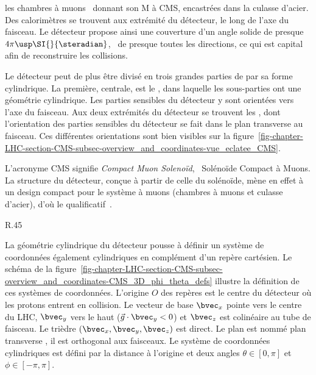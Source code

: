 les chambres à muons~\cite{CERN-LHCC-97-032} donnant son \og M \fg{} à CMS, encastrées dans la culasse d'acier.
Des calorimètres \og \CMSforwards \fg{} se trouvent aux extrémité du détecteur, le long de l'axe du faisceau.
Le détecteur propose ainsi une couverture d'un angle solide de presque $4\pi\usp\SI{}{\steradian}$, \ie\ de presque toutes les directions, ce qui est capital afin de reconstruire les collisions.
\par Le détecteur peut de plus être divisé en trois grandes parties de par sa forme cylindrique.
La première, centrale, est le \og \CMSbarrel \fg, dans laquelle les sous-parties ont une géométrie cylindrique.
Les parties sensibles du détecteur y sont orientées vers l'axe du faisceau.
Aux deux extrémités du détecteur se trouvent les \og \CMSendcaps \fg, dont l'orientation des parties sensibles du détecteur se fait dans le plan transverse au faisceau.
Ces différentes orientations sont bien visibles sur la figure~\ref{fig-chapter-LHC-section-CMS-subsec-overview_and_coordinates-vue_eclatee_CMS}.
\par L'acronyme CMS signifie \emph{Compact Muon Solenoïd}, \ie\ Solénoïde Compact à Muons.
La structure du détecteur, conçue à partir de celle du solénoïde, mène en effet à un design compact pour le système à muons (chambres à muons et culasse d'acier), d'où le qualificatif~\cite{cms_letter_intent}.
\begin{wrapfigure}{R}{.45\textwidth}
\centering

\caption[Système de coordonnées du détecteur CMS.]{Système de coordonnées.}
\label{fig-chapter-LHC-section-CMS-subsec-overview_and_coordinates-CMS_3D_phi_theta_defs}
\end{wrapfigure}
\par La géométrie cylindrique du détecteur pousse à définir un système de coordonnées également cylindriques en complément d'un repère cartésien.
Le schéma de la figure~\ref{fig-chapter-LHC-section-CMS-subsec-overview_and_coordinates-CMS_3D_phi_theta_defs} illustre la définition de ces systèmes de coordonnées.
L'origine $O$ des repères est le centre du détecteur où les protons entrent en collision.
Le vecteur de base $\bvec_x$ pointe vers le centre du LHC,
$\bvec_y$ vers le haut ($\vec{g}\cdot\bvec_y<0$) et
$\bvec_z$ est colinéaire au tube de faisceau.
Le trièdre $(\bvec_x, \bvec_y, \bvec_z)$ est direct.
Le plan  est nommé \og plan transverse \fg, il est orthogonal aux faisceaux.
Le système de coordonnées cylindriques est défini par la distance à l'origine et deux angles $\theta\in[0,\pi]$ et $\phi\in[-\pi,\pi]$.
